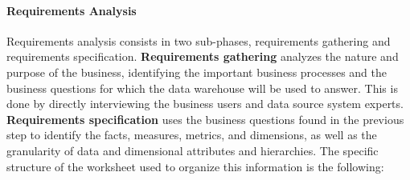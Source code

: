 \paragraph{Requirements Analysis} Requirements analysis consists in two sub-phases, requirements gathering and requirements specification. \textbf{Requirements gathering} analyzes the nature and purpose of the business, identifying the important business processes and the business questions for which the data warehouse will be used to answer. This is done by directly interviewing the business users and data source system experts. \textbf{Requirements specification} uses the business questions found in the previous step to identify the facts, measures, metrics, and dimensions, as well as the granularity of data and dimensional attributes and hierarchies. The specific structure of the worksheet used to organize this information is the following:


